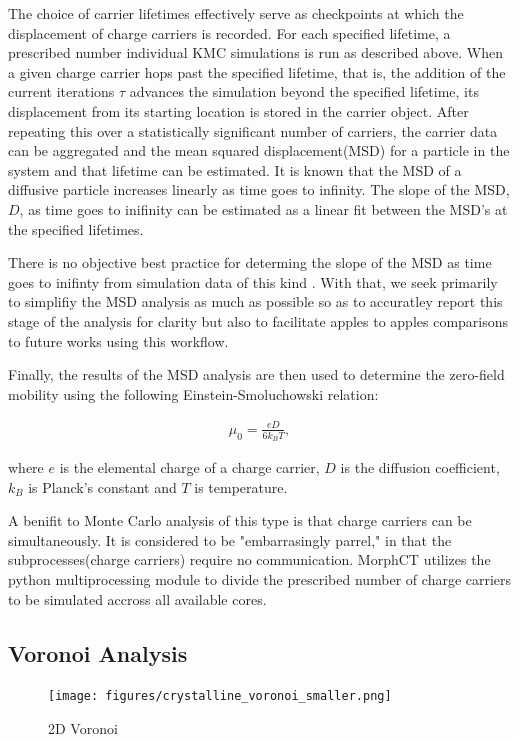 The choice of carrier lifetimes effectively serve as checkpoints at which the displacement of charge carriers is recorded. For
each specified lifetime, a prescribed number individual KMC simulations is run as described above. When a
given charge carrier hops past the specified lifetime, that is, the addition of the current iterations $\tau$ advances
the simulation beyond the specified lifetime,  its displacement from its starting location is stored in the carrier object. After repeating this over a
statistically significant number of carriers, the carrier data can be aggregated and the mean squared
displacement(MSD) for a particle in the system and that lifetime can be estimated.
It is known that the MSD of a diffusive particle increases linearly as time goes to infinity. 
The slope of the MSD, $D$,  as time
goes to inifinity can be estimated as a linear fit between the MSD's at the specified lifetimes.

There is no objective best practice for determing the slope of the MSD as
time goes to inifinty from simulation data of this kind \cite{Maginn2018}. With that, we seek primarily to simplifiy the MSD analysis as much as
possible so as to accuratley report this stage of the analysis for clarity but also to facilitate apples to
apples comparisons to future works using this workflow. 

Finally, the results of the MSD analysis are then used to determine the zero-field mobility using the following Einstein-Smoluchowski relation:

\begin{align}
    \mu_{0} = \frac{eD}{6k_{B}T},
\end{align}

where $e$ is the elemental charge of a charge carrier, $D$ is the diffusion coefficient, $k_{B}$ is Planck's
constant and $T$ is temperature.  

A benifit to Monte Carlo analysis of this type is that charge carriers can be simultaneously. It is considered
to be "embarrasingly parrel," in that the subprocesses(charge carriers) require no communication.
MorphCT utilizes the python multiprocessing module to divide the prescribed number of charge carriers to be
simulated accross all available cores.  

\subsection{Voronoi Analysis}

\begin{figure}
  \center
  \texttt{[image: figures/crystalline\_voronoi\_smaller.png]} 
  \caption{2D Voronoi}
  \label{fig:2d}
\end{figure}



